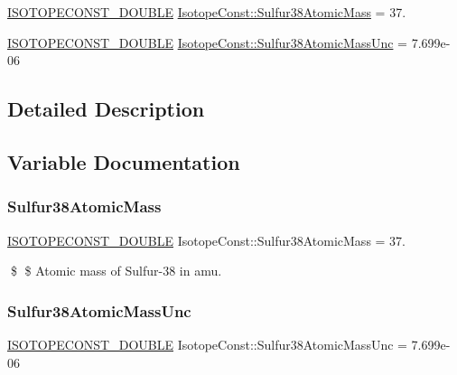 \begin{DoxyCompactItemize}
\item 
\mbox{\hyperlink{group___isotope_const-_macros_ga8f45a7272ce02c0b4c65c44636ed719a}{I\+S\+O\+T\+O\+P\+E\+C\+O\+N\+S\+T\+\_\+\+D\+O\+U\+B\+LE}} \mbox{\hyperlink{group___isotope_const-_sulfur-_s38_ga0b21ac784f4809e115eb8e16f098fbb8}{Isotope\+Const\+::\+Sulfur38\+Atomic\+Mass}} = 37.
\item 
\mbox{\hyperlink{group___isotope_const-_macros_ga8f45a7272ce02c0b4c65c44636ed719a}{I\+S\+O\+T\+O\+P\+E\+C\+O\+N\+S\+T\+\_\+\+D\+O\+U\+B\+LE}} \mbox{\hyperlink{group___isotope_const-_sulfur-_s38_ga2fbb2d04a31a2f52a7f8b05e0750dca1}{Isotope\+Const\+::\+Sulfur38\+Atomic\+Mass\+Unc}} = 7.\+699e-\/06
\end{DoxyCompactItemize}


\subsection{Detailed Description}


\subsection{Variable Documentation}
\mbox{\label{group___isotope_const-_sulfur-_s38_ga0b21ac784f4809e115eb8e16f098fbb8}} 
\subsubsection{\texorpdfstring{Sulfur38\+Atomic\+Mass}{Sulfur38AtomicMass}}
{\footnotesize\ttfamily \mbox{\hyperlink{group___isotope_const-_macros_ga8f45a7272ce02c0b4c65c44636ed719a}{I\+S\+O\+T\+O\+P\+E\+C\+O\+N\+S\+T\+\_\+\+D\+O\+U\+B\+LE}} Isotope\+Const\+::\+Sulfur38\+Atomic\+Mass = 37.}

\$ \$ Atomic mass of Sulfur-\/38 in amu. \mbox{\label{group___isotope_const-_sulfur-_s38_ga2fbb2d04a31a2f52a7f8b05e0750dca1}} 
\subsubsection{\texorpdfstring{Sulfur38\+Atomic\+Mass\+Unc}{Sulfur38AtomicMassUnc}}
{\footnotesize\ttfamily \mbox{\hyperlink{group___isotope_const-_macros_ga8f45a7272ce02c0b4c65c44636ed719a}{I\+S\+O\+T\+O\+P\+E\+C\+O\+N\+S\+T\+\_\+\+D\+O\+U\+B\+LE}} Isotope\+Const\+::\+Sulfur38\+Atomic\+Mass\+Unc = 7.\+699e-\/06}

